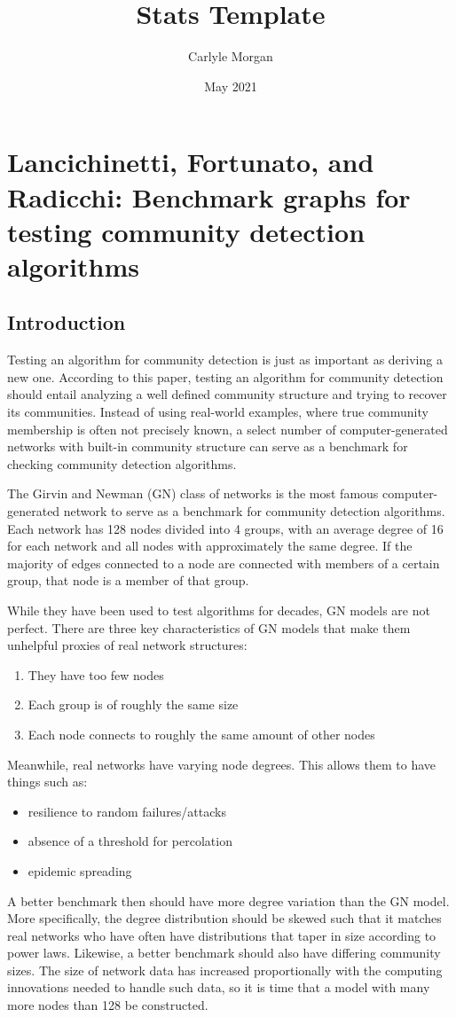 \documentclass{article}
\title{Stats Template}
\author{Carlyle Morgan}
\date{May 2021}
\begin{document}
\section{Lancichinetti, Fortunato, and Radicchi: Benchmark graphs for testing community detection algorithms}
\subsection{Introduction}
Testing an algorithm for community detection is just as important as deriving a new one. According to this paper, testing an algorithm for community detection should entail analyzing a well defined community structure and trying to recover its communities. Instead of using real-world examples, where true community membership is often not precisely known, a select number of computer-generated networks with built-in community structure can serve as a benchmark for checking community detection algorithms.

The Girvin and Newman (GN) class of networks is the most famous computer-generated network to serve as a benchmark for community detection algorithms. Each network has 128 nodes divided into 4 groups, with an average degree of 16 for each network and all nodes with approximately the same degree. If the majority of edges connected to a node are connected with members of a certain group, that node is a member of that group. 

While they have been used to test algorithms for decades, GN models are not perfect. There are three key characteristics of GN models that make them unhelpful proxies of real network structures:
\begin{enumerate}
\item They have too few nodes
\item Each group is of roughly the same size
\item Each node connects to roughly the same amount of other nodes
\end{enumerate}
Meanwhile, real networks have varying node degrees. This allows them to have things such as:
\begin{itemize}
\item resilience to random failures/attacks
\item absence of a threshold for percolation
\item epidemic spreading
\end{itemize}
A better benchmark then should have more degree variation than the GN model. More specifically, the degree distribution should be skewed such that it matches real networks who have often have distributions that taper in size according to power laws.
Likewise, a better benchmark should also have differing community sizes. The size of network data has increased proportionally with the computing innovations needed to handle such data, so it is time that a model with many more nodes than 128 be constructed.
\end{document}
